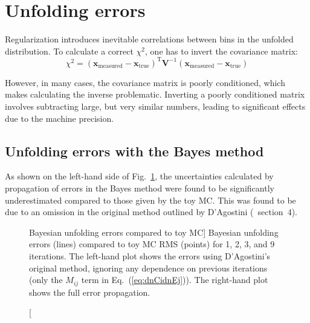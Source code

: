 \documentclass{cernrep}
\begin{document}
\section{Unfolding errors}

Regularization introduces inevitable correlations between bins in the unfolded distribution.
To calculate a correct $\chi^2$, one has to invert the covariance matrix:
\begin{equation}
\chi^2 = (\mathbf{x}_{\mathrm{measured}} - \mathbf{x}_{\mathrm{true}})^{\mathrm{T}} \mathbf{V}^{-1}
         (\mathbf{x}_{\mathrm{measured}} - \mathbf{x}_{\mathrm{true}})
\end{equation}

However, in many cases, the covariance matrix is poorly conditioned,
which makes calculating the inverse problematic.
Inverting a poorly conditioned matrix involves subtracting large, but
very similar numbers, leading to significant effects due to the
machine precision.

\subsection{Unfolding errors with the Bayes method}

As shown on the left-hand side of Fig.~\ref{fig:bayes_errors},
the uncertainties calculated by propagation of errors in the Bayes method
were found to be significantly underestimated compared to those given by the toy MC.
This was found to be due to an omission in the original method
outlined by D'Agostini (\cite{D'Agostini:1994zf}~section~4).%
\begin{figure}
%
\caption
[Bayesian unfolding errors compared to toy MC]%
{Bayesian unfolding errors (lines) compared to toy MC RMS (points) for 1, 2, 3, and 9 iterations.
The left-hand plot shows the errors using D'Agostini's original method,
ignoring any dependence on previous iterations (only the $M_{ij}$ term in Eq.~(\ref{eq:dnCidnEj})).
The right-hand plot shows the full error propagation.}%
\label{fig:bayes_errors}%
\end{figure}
\end{document}
